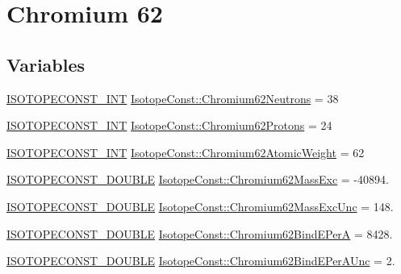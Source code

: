 \hypertarget{group___isotope_const-_chromium-_cr62}{}\section{Chromium 62}
\label{group___isotope_const-_chromium-_cr62}
\subsection*{Variables}
\begin{DoxyCompactItemize}
\item 
\mbox{\hyperlink{group___isotope_const-_macros_ga5f18360b3e99483a35c32d789e62621c}{I\+S\+O\+T\+O\+P\+E\+C\+O\+N\+S\+T\+\_\+\+I\+NT}} \mbox{\hyperlink{group___isotope_const-_chromium-_cr62_ga5b707fea202b89ddd84513e8ea53d451}{Isotope\+Const\+::\+Chromium62\+Neutrons}} = 38
\item 
\mbox{\hyperlink{group___isotope_const-_macros_ga5f18360b3e99483a35c32d789e62621c}{I\+S\+O\+T\+O\+P\+E\+C\+O\+N\+S\+T\+\_\+\+I\+NT}} \mbox{\hyperlink{group___isotope_const-_chromium-_cr62_ga248dee1eafae7df72119c44dc2d0aaef}{Isotope\+Const\+::\+Chromium62\+Protons}} = 24
\item 
\mbox{\hyperlink{group___isotope_const-_macros_ga5f18360b3e99483a35c32d789e62621c}{I\+S\+O\+T\+O\+P\+E\+C\+O\+N\+S\+T\+\_\+\+I\+NT}} \mbox{\hyperlink{group___isotope_const-_chromium-_cr62_ga8a23931f36d4f86ef7d3d39a54fdb619}{Isotope\+Const\+::\+Chromium62\+Atomic\+Weight}} = 62
\item 
\mbox{\hyperlink{group___isotope_const-_macros_ga8f45a7272ce02c0b4c65c44636ed719a}{I\+S\+O\+T\+O\+P\+E\+C\+O\+N\+S\+T\+\_\+\+D\+O\+U\+B\+LE}} \mbox{\hyperlink{group___isotope_const-_chromium-_cr62_ga02dfadfd5a0fb5b51e20fc3e453c2919}{Isotope\+Const\+::\+Chromium62\+Mass\+Exc}} = -\/40894.
\item 
\mbox{\hyperlink{group___isotope_const-_macros_ga8f45a7272ce02c0b4c65c44636ed719a}{I\+S\+O\+T\+O\+P\+E\+C\+O\+N\+S\+T\+\_\+\+D\+O\+U\+B\+LE}} \mbox{\hyperlink{group___isotope_const-_chromium-_cr62_ga9ae9f8ec01cb20b9e02e325b73e9e9f6}{Isotope\+Const\+::\+Chromium62\+Mass\+Exc\+Unc}} = 148.
\item 
\mbox{\hyperlink{group___isotope_const-_macros_ga8f45a7272ce02c0b4c65c44636ed719a}{I\+S\+O\+T\+O\+P\+E\+C\+O\+N\+S\+T\+\_\+\+D\+O\+U\+B\+LE}} \mbox{\hyperlink{group___isotope_const-_chromium-_cr62_gacafb3b7068625cca8a4babd22e84aee5}{Isotope\+Const\+::\+Chromium62\+Bind\+E\+PerA}} = 8428.
\item 
\mbox{\hyperlink{group___isotope_const-_macros_ga8f45a7272ce02c0b4c65c44636ed719a}{I\+S\+O\+T\+O\+P\+E\+C\+O\+N\+S\+T\+\_\+\+D\+O\+U\+B\+LE}} \mbox{\hyperlink{group___isotope_const-_chromium-_cr62_ga68211ecadf21700563aaa3c9c887353b}{Isotope\+Const\+::\+Chromium62\+Bind\+E\+Per\+A\+Unc}} = 2.

\end{DoxyCompactItemize}
